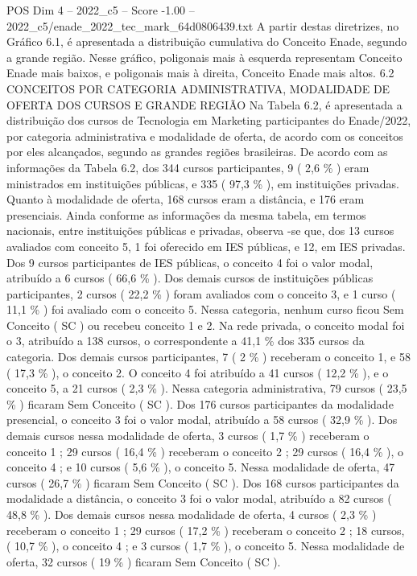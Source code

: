 \begin{textsample}{POS Dim 4 – 2022\_c5 – Score -1.00 – 2022\_c5/enade\_2022\_tec\_mark\_64d0806439.txt}
A partir destas diretrizes, no Gráfico 6.1, é apresentada a distribuição cumulativa do Conceito Enade, segundo a grande região.
Nesse gráfico, poligonais mais à esquerda representam Conceito Enade mais baixos, e poligonais mais à direita, Conceito Enade mais altos. 6.2 CONCEITOS POR CATEGORIA ADMINISTRATIVA, MODALIDADE DE OFERTA DOS CURSOS E GRANDE REGIÃO Na Tabela 6.2, é apresentada a distribuição dos cursos de Tecnologia em Marketing participantes do Enade/2022, por categoria administrativa e modalidade de oferta, de acordo com os conceitos por eles alcançados, segundo as grandes regiões brasileiras.
De acordo com as informações da Tabela 6.2, dos 344 cursos participantes, 9 ( 2,6 \% ) eram ministrados em instituições públicas, e 335 ( 97,3 \% ), em instituições privadas.
Quanto à modalidade de oferta, 168 cursos eram a distância, e 176 eram presenciais.
Ainda conforme as informações da mesma tabela, em termos nacionais, entre instituições públicas e privadas, observa -se que, dos 13 cursos avaliados com conceito 5, 1 foi oferecido em IES públicas, e 12, em IES privadas.
Dos 9 cursos participantes de IES públicas, o conceito 4 foi o valor modal, atribuído a 6 cursos ( 66,6 \% ).
Dos demais cursos de instituições públicas participantes, 2 cursos ( 22,2 \% ) foram avaliados com o conceito 3, e 1 curso ( 11,1 \% ) foi avaliado com o conceito 5.
Nessa categoria, nenhum curso ficou Sem Conceito ( SC ) ou recebeu conceito 1 e 2.
Na rede privada, o conceito modal foi o 3, atribuído a 138 cursos, o correspondente a 41,1 \% dos 335 cursos da categoria.
Dos demais cursos participantes, 7 ( 2 \% ) receberam o conceito 1, e 58 ( 17,3 \% ), o conceito 2.
O conceito 4 foi atribuído a 41 cursos ( 12,2 \% ), e o conceito 5, a 21 cursos ( 2,3 \% ).
Nessa categoria administrativa, 79 cursos ( 23,5 \% ) ficaram Sem Conceito ( SC ).
Dos 176 cursos participantes da modalidade presencial, o conceito 3 foi o valor modal, atribuído a 58 cursos ( 32,9 \% ).
Dos demais cursos nessa modalidade de oferta, 3 cursos ( 1,7 \% ) receberam o conceito 1 ; 29 cursos ( 16,4 \% ) receberam o conceito 2 ; 29 cursos ( 16,4 \% ), o conceito 4 ; e 10 cursos ( 5,6 \% ), o conceito 5.
Nessa modalidade de oferta, 47 cursos ( 26,7 \% ) ficaram Sem Conceito ( SC ).
Dos 168 cursos participantes da modalidade a distância, o conceito 3 foi o valor modal, atribuído a 82 cursos ( 48,8 \% ).
Dos demais cursos nessa modalidade de oferta, 4 cursos ( 2,3 \% ) receberam o conceito 1 ; 29 cursos ( 17,2 \% ) receberam o conceito 2 ; 18 cursos, ( 10,7 \% ), o conceito 4 ; e 3 cursos ( 1,7 \% ), o conceito 5.
Nessa modalidade de oferta, 32 cursos ( 19 \% ) ficaram Sem Conceito ( SC ).

\end{textsample}

